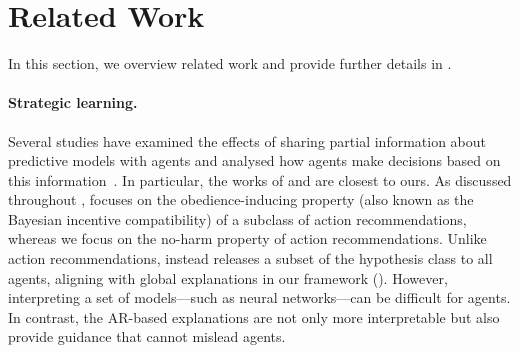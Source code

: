 \section{Related Work}
In this section, we overview related work and provide further details in .



\paragraph{Strategic learning.} Several studies have examined the effects of sharing partial information about predictive models with agents and analysed how agents make decisions based on this information~\citep{jagadeesan2021alternative, ghalme2021strategic, bechavod2022information, harris2022bayesian, haghtalab2024calibrated, xie2024non, cohen2024bayesian}. 
In particular, the works of \citet{harris2022bayesian} and \citet{cohen2024bayesian} are closest to ours. As discussed throughout , \citet{harris2022bayesian} focuses on the obedience-inducing property (also known as the Bayesian incentive compatibility) of a subclass of action recommendations, whereas we focus on the no-harm property of action recommendations. 
Unlike action recommendations, \citet{cohen2024bayesian} instead releases a subset of the hypothesis class to all agents, aligning with global explanations in our framework (). However, interpreting a set of models—such as neural networks—can be difficult for agents. In contrast, the AR-based explanations are not only more interpretable but also provide guidance that cannot mislead agents.

